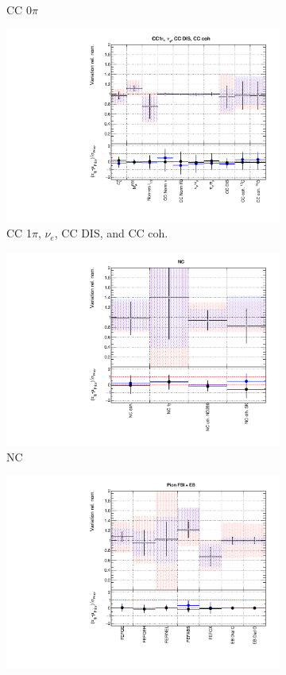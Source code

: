 \begin{figure}[t]
\begin{subfigure}{0.49\textwidth}
  \caption{CC 0$\pi$}
\end{subfigure}
\begin{subfigure}{0.49\textwidth}
  \centering
  \includegraphics[width=0.95\linewidth]{figs/rhcmpasmvxsec2}
  \caption{CC 1$\pi$, $\nu_e$, CC DIS, and CC coh.}
\end{subfigure}
\begin{subfigure}{0.49\textwidth}
  \centering
  \includegraphics[width=0.95\linewidth]{figs/rhcmpasmvxsec3}
  \caption{NC}
\end{subfigure}
\begin{subfigure}{0.49\textwidth}
  \centering
  \includegraphics[width=0.95\linewidth]{figs/rhcmpasmvxsec4}

\end{subfigure}
\end{figure}

